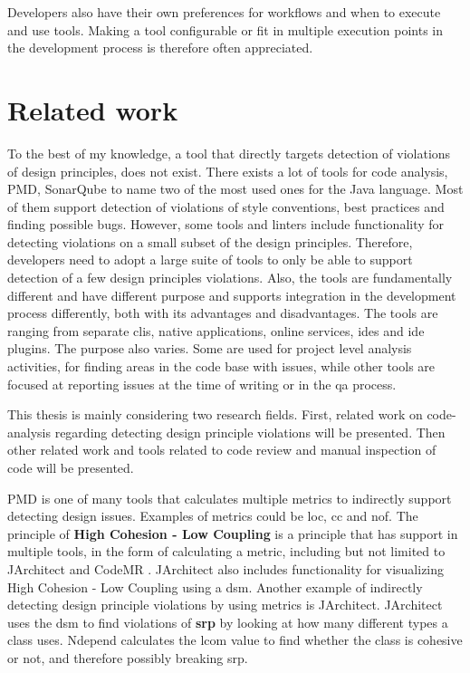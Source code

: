 \documentclass{report}
\begin{document}
Developers also have their own preferences for workflows and when to execute and use tools. Making a tool configurable or fit in multiple execution points in the development process is therefore often appreciated.

\chapter{Related work}
\label{relatedwork}

To the best of my knowledge, a tool that directly targets detection of violations of design principles, does not exist. There exists a lot of tools for code analysis, PMD\cite{pmd}, SonarQube\cite{sonarqube} to name two of the most used ones for the Java language. Most of them support detection of violations of style conventions, best practices and finding possible bugs. However, some tools and linters include functionality for detecting violations on a small subset of the design principles. Therefore, developers need to adopt a large suite of tools to only be able to support detection of a few design principles violations. Also, the tools are fundamentally different and have different purpose and supports integration in the development process differently, both with its advantages and disadvantages. The tools are ranging from separate \gls{cli}s, native applications, online services, \gls{ide}s and \gls{ide} plugins. The purpose also varies. Some are used for project level analysis activities, for finding areas in the code base with issues, while other tools are focused at reporting issues at the time of writing or in the \gls{qa} process. 

This thesis is mainly considering two research fields. First, related work on code-analysis regarding detecting design principle violations will be presented. Then other related work and tools related to code review and manual inspection of code will be presented.

PMD \cite{pmd} is one of many tools that calculates multiple metrics to indirectly support detecting design issues. Examples of metrics could be \gls{loc}, \gls{cc} and \gls{nof}. The principle of \textbf{High Cohesion - Low Coupling} is a principle that has support in multiple tools, in the form of calculating a metric, including but not limited to JArchitect \cite{jarchitect} and CodeMR \cite{codemr}. JArchitect \cite{jarchitect} also includes functionality for visualizing  High Cohesion - Low Coupling using a \gls{dsm}. Another example of indirectly detecting design principle violations by using metrics is JArchitect. JArchitect uses the \gls{dsm} to find violations of \textbf{\gls{srp}} by looking at how many different types a class uses. Ndepend \cite{ndepend} calculates the \gls{lcom} value to find whether the class is cohesive or not, and therefore possibly breaking \gls{srp}. 
\end{document}
